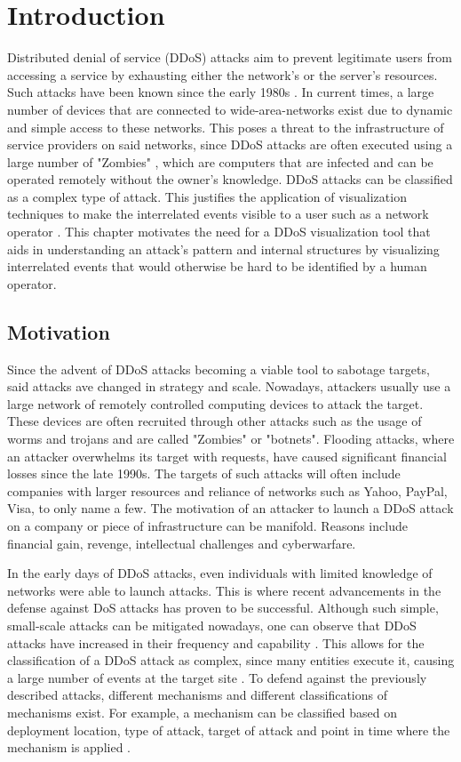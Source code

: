 \chapter{Introduction}
Distributed denial of service (DDoS) attacks aim to prevent legitimate users from accessing a service by exhausting either the network's or the server's resources. Such attacks have been known since the early 1980s \cite{zargar}. In current times, a large number of devices that are connected to wide-area-networks exist due to dynamic and simple access to these networks. This poses a threat to the infrastructure of service providers on said networks, since DDoS attacks are often executed using a large number of "Zombies" \cite{zargar} \cite{kamboj}, which are computers that are infected and can be operated remotely without the owner's knowledge. DDoS attacks can be classified as a complex type of attack. This justifies the application of visualization techniques to make the interrelated events visible to a user such as a network operator \cite{yelizarov}.  This chapter motivates the need for a DDoS visualization tool that aids in understanding an attack's pattern and internal structures by visualizing interrelated events that would otherwise be hard to be identified by a human operator.

\section{Motivation}
Since the advent of DDoS attacks becoming a viable tool to sabotage targets, said attacks ave changed in strategy and scale. Nowadays, attackers usually use a large network of remotely controlled computing devices to attack the target. These devices are often recruited through other attacks such as the usage of worms and trojans and are called "Zombies" or "botnets".
Flooding attacks, where an attacker overwhelms its target with requests, have caused significant financial losses since the late 1990s. The targets of such attacks will often include companies with larger resources and reliance of networks such as Yahoo, PayPal, Visa, to only name a few. The motivation of an attacker to launch a DDoS attack on a company or piece of infrastructure can be manifold. Reasons include financial gain, revenge, intellectual challenges and cyberwarfare.

In the early days of DDoS attacks, even individuals with limited knowledge of networks were able to launch attacks. This is where recent advancements in the defense against DoS attacks has proven to be successful. Although such simple, small-scale attacks can be mitigated nowadays, one can observe that DDoS attacks have increased in their frequency and capability \cite{zargar}.
This allows for the classification of a DDoS attack as complex, since many entities execute it, causing a large number of events at the target site \cite{yelizarov}.
To defend against the previously described attacks, different mechanisms and different classifications of mechanisms exist. For example, a mechanism can be classified based on deployment location, type of attack, target of attack and point in time where the mechanism is applied \cite{zargar}.

